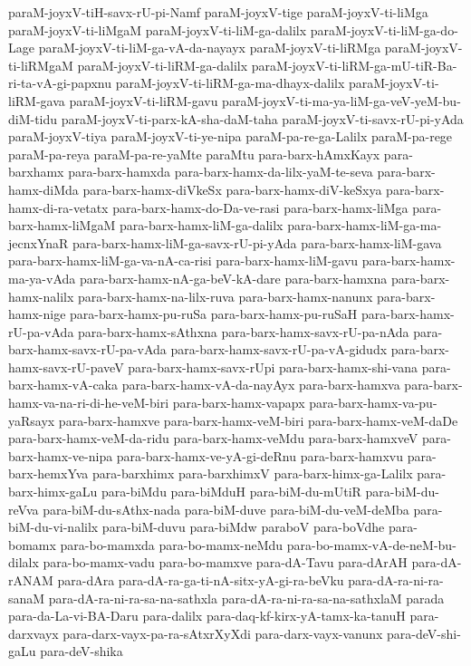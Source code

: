 {paraM-joyxV-tiH-savx-rU-pi-Namf
paraM-joyxV-tige
paraM-joyxV-ti-liMga
paraM-joyxV-ti-liMgaM
paraM-joyxV-ti-liM-ga-dalilx
paraM-joyxV-ti-liM-ga-do-Lage
paraM-joyxV-ti-liM-ga-vA-da-nayayx
paraM-joyxV-ti-liRMga
paraM-joyxV-ti-liRMgaM
paraM-joyxV-ti-liRM-ga-dalilx
paraM-joyxV-ti-liRM-ga-mU-tiR-Ba-ri-ta-vA-gi-papxnu
paraM-joyxV-ti-liRM-ga-ma-dhayx-dalilx
paraM-joyxV-ti-liRM-gava
paraM-joyxV-ti-liRM-gavu
paraM-joyxV-ti-ma-ya-liM-ga-veV-yeM-bu-diM-tidu
paraM-joyxV-ti-parx-kA-sha-daM-taha
paraM-joyxV-ti-savx-rU-pi-yAda
paraM-joyxV-tiya
paraM-joyxV-ti-ye-nipa
paraM-pa-re-ga-Lalilx
paraM-pa-rege
paraM-pa-reya
paraM-pa-re-yaMte
paraMtu
para-barx-hAmxKayx
para-barxhamx
para-barx-hamxda
para-barx-hamx-da-lilx-yaM-te-seva
para-barx-hamx-diMda
para-barx-hamx-diVkeSx
para-barx-hamx-diV-keSxya
para-barx-hamx-di-ra-vetatx
para-barx-hamx-do-Da-ve-rasi
para-barx-hamx-liMga
para-barx-hamx-liMgaM
para-barx-hamx-liM-ga-dalilx
para-barx-hamx-liM-ga-ma-jecnxYnaR
para-barx-hamx-liM-ga-savx-rU-pi-yAda
para-barx-hamx-liM-gava
para-barx-hamx-liM-ga-va-nA-ca-risi
para-barx-hamx-liM-gavu
para-barx-hamx-ma-ya-vAda
para-barx-hamx-nA-ga-beV-kA-dare
para-barx-hamxna
para-barx-hamx-nalilx
para-barx-hamx-na-lilx-ruva
para-barx-hamx-nanunx
para-barx-hamx-nige
para-barx-hamx-pu-ruSa
para-barx-hamx-pu-ruSaH
para-barx-hamx-rU-pa-vAda
para-barx-hamx-sAthxna
para-barx-hamx-savx-rU-pa-nAda
para-barx-hamx-savx-rU-pa-vAda
para-barx-hamx-savx-rU-pa-vA-gidudx
para-barx-hamx-savx-rU-paveV
para-barx-hamx-savx-rUpi
para-barx-hamx-shi-vana
para-barx-hamx-vA-caka
para-barx-hamx-vA-da-nayAyx
para-barx-hamxva
para-barx-hamx-va-na-ri-di-he-veM-biri
para-barx-hamx-vapapx
para-barx-hamx-va-pu-yaRsayx
para-barx-hamxve
para-barx-hamx-veM-biri
para-barx-hamx-veM-daDe
para-barx-hamx-veM-da-ridu
para-barx-hamx-veMdu
para-barx-hamxveV
para-barx-hamx-ve-nipa
para-barx-hamx-ve-yA-gi-deRnu
para-barx-hamxvu
para-barx-hemxYva
para-barxhimx
para-barxhimxV
para-barx-himx-ga-Lalilx
para-barx-himx-gaLu
para-biMdu
para-biMduH
para-biM-du-mUtiR
para-biM-du-reVva
para-biM-du-sAthx-nada
para-biM-duve
para-biM-du-veM-deMba
para-biM-du-vi-nalilx
para-biM-duvu
para-biMdw
paraboV
para-boVdhe
para-bomamx
para-bo-mamxda
para-bo-mamx-neMdu
para-bo-mamx-vA-de-neM-bu-dilalx
para-bo-mamx-vadu
para-bo-mamxve
para-dA-Tavu
para-dArAH
para-dA-rANAM
para-dAra
para-dA-ra-ga-ti-nA-sitx-yA-gi-ra-beVku
para-dA-ra-ni-ra-sanaM
para-dA-ra-ni-ra-sa-na-sathxla
para-dA-ra-ni-ra-sa-na-sathxlaM
parada
para-da-La-vi-BA-Daru
para-dalilx
para-daq-kf-kirx-yA-tamx-ka-tanuH
para-darxvayx
para-darx-vayx-pa-ra-sAtxrXyXdi
para-darx-vayx-vanunx
para-deV-shi-gaLu
para-deV-shika
}
